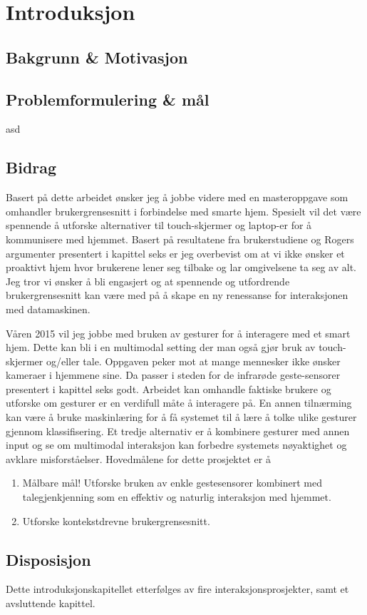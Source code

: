 \section[Introduksjon]{Introduksjon}
\subsection*{Bakgrunn \& Motivasjon}

\subsection*{Problemformulering \& mål}
asd

\subsection*{Bidrag}
Basert på dette arbeidet ønsker jeg å jobbe videre med en masteroppgave som omhandler brukergrensesnitt i forbindelse med smarte hjem. Spesielt vil det være spennende å utforske alternativer til touch-skjermer og laptop-er for å kommunisere med hjemmet. Basert på resultatene fra brukerstudiene og Rogers argumenter presentert i kapittel seks er jeg overbevist om at vi ikke ønsker et proaktivt hjem hvor brukerene lener seg tilbake og lar omgivelsene ta seg av alt. Jeg tror vi ønsker å bli engasjert og at spennende og utfordrende brukergrensesnitt kan være med på å skape en ny renessanse for interaksjonen med datamaskinen.

Våren 2015 vil jeg jobbe med bruken av gesturer for å interagere med et smart hjem. Dette kan bli i en multimodal setting der man også gjør bruk av touch-skjermer og/eller tale. Oppgaven peker mot at mange mennesker ikke ønsker kameraer i hjemmene sine. Da passer i steden for de infrarøde geste-sensorer presentert i kapittel seks godt. Arbeidet kan omhandle faktiske brukere og utforske om gesturer er en verdifull måte å interagere på. En annen tilnærming kan være å bruke maskinlæring for å få systemet til å lære å tolke ulike gesturer gjennom klassifisering. Et tredje alternativ er å kombinere gesturer med annen input og se om multimodal interaksjon kan forbedre systemets nøyaktighet og avklare misforståelser.
Hovedmålene for dette prosjektet er å
\begin{enumerate}
\item {\color{red} Målbare mål!} Utforske bruken av enkle gestesensorer kombinert med talegjenkjenning som en effektiv og naturlig interaksjon med hjemmet.
\item Utforske kontekstdrevne brukergrensesnitt.
\end{enumerate}

\subsection*{Disposisjon}
Dette introduksjonskapitellet etterfølges av fire interaksjonsprosjekter, samt et avsluttende kapittel. 
